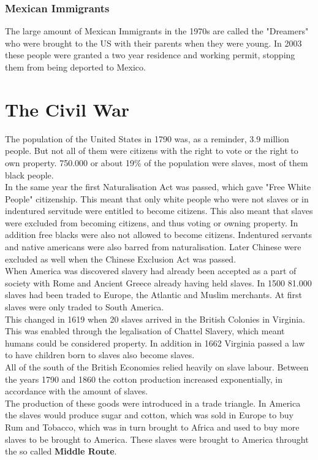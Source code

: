 \documentclass{article}
\begin{document}
	
	\subsubsection{Mexican Immigrants}
	The large amount of Mexican Immigrants in the 1970s are called the "Dreamers" who were brought to the US with their parents when they were young. In 2003 these people were granted a two year residence and working permit, stopping them from being deported to Mexico. \\
	\section{The Civil War}
	The population of the United States in 1790 was, as a reminder, 3.9 million people. But not all of them were citizens with the right to vote or the right to own property. 750.000 or about 19\% of the population were slaves, most of them black people. \\
	In the same year the first Naturalisation Act was passed, which gave "Free White People" citizenship. This meant that only white people who were not slaves or in indentured servitude were entitled to become citizens. This also meant that slaves were excluded from becoming citizens, and thus voting or owning property. In addition free blacks were also not allowed to become citizens. Indentured servants and native americans were also barred from naturalisation. Later Chinese were excluded as well when the Chinese Exclusion Act was passed. \\
	When America was discovered slavery had already been accepted as a part of society with Rome and Ancient Greece already having held slaves. In 1500 81.000 slaves had been traded to Europe, the Atlantic and Muslim merchants. At first slaves were only traded to South America. \\
	This changed in 1619 when 20 slaves arrived in the British Colonies in Virginia. This was enabled through the legalisation of Chattel Slavery, which meant humans could be considered property. In addition in 1662 Virginia passed a law to have children born to slaves also become slaves. \\
	All of the south of the British Economies relied heavily on slave labour. Between the years 1790 and 1860 the cotton production increased exponentially, in accordance with the amount of slaves. \\
	The production of these goods were introduced in a trade triangle. In America the slaves would produce sugar and cotton, which was sold in Europe to buy Rum and Tobacco, which was in turn brought to Africa and used to buy more slaves to be brought to America. These slaves were brought to America throught the so called \textbf{Middle Route}. \\
\end{document}
